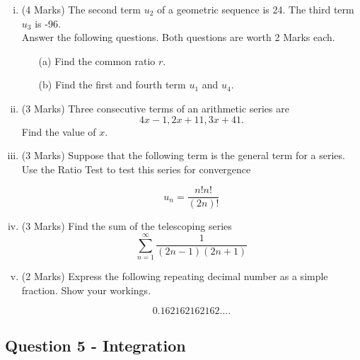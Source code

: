 \documentclass[a4paper,12pt]{article}
\begin{document}
\begin{enumerate}[(i)]
	\item (4 Marks)
	The second term $u_2$ of a geometric sequence is 24. The third term $u_3$ is -96. \\ \bigskip Answer the following questions. Both questions are worth 2 Marks each.
	\begin{itemize}
		\item[(a)] Find the common ratio $r$. 
		\item[(b)] Find the first and fourth term $u_1$ and $u_4$.
	\end{itemize}

	
\bigskip

	\item (3 Marks)	Three consecutive terms of an arithmetic series are \[4x - 1, 2x +11, 3x + 41. \]
	Find the value of $x$.
	

\bigskip
	
	\item (3 Marks) Suppose that the following term is the general term for a series. Use the Ratio Test to test this series for convergence
	
	\[u_n=\frac{n!n!}{(2n)!}\]

\bigskip
	
		\item (3 Marks) Find the sum of the telescoping series  \[ \sum^{\infty}_{n=1} \frac{1}{(2n-1)(2n+1)}\]

\bigskip
		
	\item (2 Marks) Express the following repeating decimal number as a simple fraction. Show your workings.
	
	\[0.162162162162....\]
%	
%	
	
	
	
\end{enumerate}

\newpage
\subsection*{Question 5 - Integration}


\end{document}
